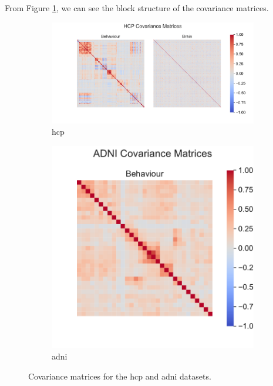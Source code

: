 From Figure \ref{fig:covariance-matrices-real}, we can see the block structure of the covariance matrices.

\begin{figure}
    \centering
    \begin{subfigure}{0.66\linewidth}
        \centering
        \includegraphics[width=\linewidth]{figures/covariance/hcp_covariance}
        \caption{\acrshort{hcp}}
    \end{subfigure}
%
    \begin{subfigure}{0.33\linewidth}
        \centering
        \includegraphics[width=\linewidth]{figures/covariance/adni_covariance}
        \caption{\acrshort{adni}}
    \end{subfigure}
    \caption{Covariance matrices for the \acrshort{hcp} and \acrshort{adni} datasets.}
    \label{fig:covariance-matrices-real}
\end{figure}

